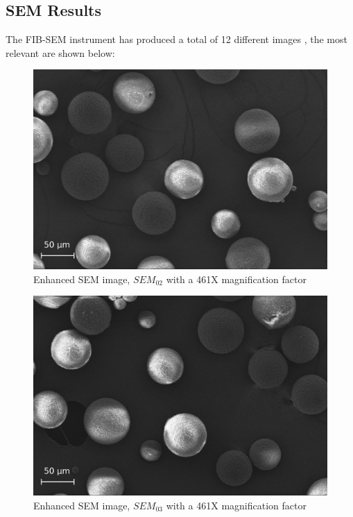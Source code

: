 \documentclass{article}
\begin{document}
      \subsection{SEM Results\label{SEM_analysis_results}}

                
      The FIB-SEM instrument has produced a total of 12 different images \autocites{Pixelmator_Pro}{GIMP}, the most relevant are shown below: \\


          \begin{figure}[h!]
              \centering 
              \includegraphics[width=\textwidth]{Pictures/SEM/Edited/04_02.eps}
              \caption{Enhanced SEM image, $SEM_{02}$ with a 461X magnification factor}
              \label{fig:SEM_02}
          \end{figure}

          \begin{figure}[h!]
              \centering 
              \includegraphics[width=\textwidth]{Pictures/SEM/Edited/04_03.eps}
              \caption{Enhanced SEM image, $SEM_{03}$ with a 461X magnification factor}
              \label{fig:SEM_03}
          \end{figure}
\end{document}
